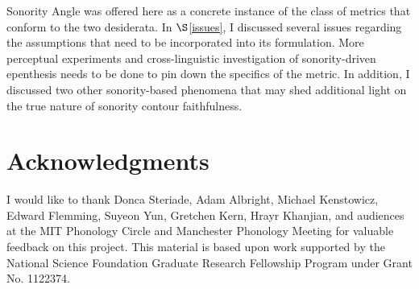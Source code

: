 \documentclass[12pt]{article}
\begin{document}
{\sc Sonority Angle} was offered here as a concrete instance of the class of metrics that conform to the two desiderata. In $\S$\ref{issues}, I discussed several issues regarding the assumptions that need to be incorporated into its formulation. More perceptual experiments and cross-linguistic investigation of sonority-driven epenthesis needs to be done to pin down the specifics of the metric. In addition, I discussed two other sonority-based phenomena that may shed additional light on the true nature of sonority contour faithfulness.

\section*{Acknowledgments}

I would like to thank Donca Steriade, Adam Albright, Michael Kenstowicz, Edward Flemming, Suyeon Yun, Gretchen Kern, Hrayr Khanjian, and audiences at the MIT Phonology Circle and Manchester Phonology Meeting for valuable feedback on this project. This material is based upon work supported by the National Science Foundation Graduate Research Fellowship Program under Grant No. 1122374.



\end{document}
